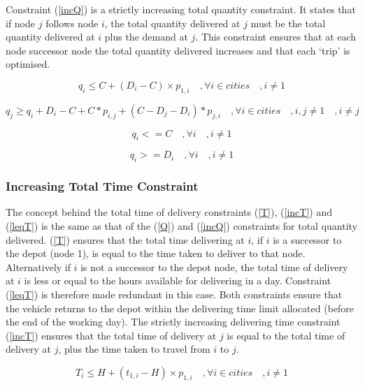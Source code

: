\documentclass[a4paper,11pt]{article}
\begin{document}
Constraint (\ref{incQ}) is a strictly increasing total quantity constraint. It states that if node $j$ follows node $i$, the total quantity delivered at $j$ must be the total quantity delivered at $i$ plus the demand at $j$. This constraint ensures that at each node successor node the total quantity delivered increases and that each `trip' is optimised.

\begin{equation}\label{Q}
q_{i} \leq C + (D_{i} - C) \times  p _{1,i} \quad, \forall i \in cities\quad, i\neq1
\end{equation}

\begin{equation}\label{incQ}
q_{j} \geq q_{i} + D_{i} - C + C*p_{i,j}  + (C-D_{j}-D_{i})*p_{j,i}\quad, \forall i \in cities\quad, i,j \neq 1 \quad, i\neq j
\end{equation}

\begin{equation}\label{Qleq}
q_{i} <= C \quad, \forall i\quad, i\neq1
\end{equation}

\begin{equation}\label{Qgeq}
q_{i} >= D_{i} \quad, \forall i\quad, i\neq1
\end{equation}


\subsubsection{Increasing Total Time Constraint}

The concept behind the total time of delivery constraints (\ref{T}), (\ref{incT}) and (\ref{leqT})  is the same as that of the (\ref{Q}) and (\ref{incQ}) constraints for total quantity delivered. (\ref{T}) ensures that the total time delivering at $i$, if $i$ is a successor to the depot (node 1), is equal to the time taken to deliver to that node. Alternatively if $i$ is not a successor to the depot node, the total time of delivery at $i$ is less or equal to the hours available for delivering in a day. Constraint (\ref{leqT}) is therefore made redundant in this case. Both constraints ensure that the vehicle returns to the depot within the delivering time limit allocated (before the end of the working day). The strictly increasing delivering time constraint (\ref{incT}) ensures that the total time of delivery at $j$ is equal to the total time of delivery at $j$, plus the time taken to travel from $i$ to $j$.

\begin{equation}\label{T}
T_{i} \leq H + (t_{1,i} - H) \times  p _{1,i} \quad, \forall i \in cities \quad, i\neq1
\end{equation}
\end{document}
